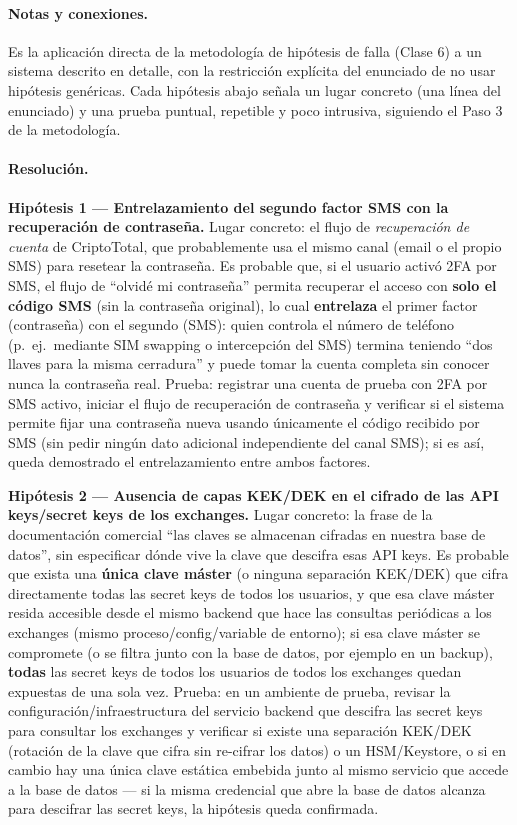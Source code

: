 \paragraph{Notas y conexiones.}
Es la aplicación directa de la metodología de hipótesis de falla (Clase 6) a un sistema
descrito en detalle, con la restricción explícita del enunciado de no usar hipótesis
genéricas. Cada hipótesis abajo señala un lugar concreto (una línea del enunciado) y una
prueba puntual, repetible y poco intrusiva, siguiendo el Paso 3 de la metodología.

\paragraph{Resolución.}

\textbf{Hipótesis 1 --- Entrelazamiento del segundo factor SMS con la recuperación de
contraseña.} Lugar concreto: el flujo de \emph{recuperación de cuenta} de CriptoTotal, que
probablemente usa el mismo canal (email o el propio SMS) para resetear la contraseña. Es
probable que, si el usuario activó 2FA por SMS, el flujo de ``olvidé mi contraseña'' permita
recuperar el acceso con \textbf{solo el código SMS} (sin la contraseña original), lo cual
\textbf{entrelaza} el primer factor (contraseña) con el segundo (SMS): quien controla el
número de teléfono (p.\ ej.\ mediante SIM swapping o intercepción del SMS) termina teniendo
``dos llaves para la misma cerradura'' y puede tomar la cuenta completa sin conocer nunca la
contraseña real. Prueba: registrar una cuenta de prueba con 2FA por SMS activo, iniciar el
flujo de recuperación de contraseña y verificar si el sistema permite fijar una contraseña
nueva usando únicamente el código recibido por SMS (sin pedir ningún dato adicional
independiente del canal SMS); si es así, queda demostrado el entrelazamiento entre ambos
factores.

\textbf{Hipótesis 2 --- Ausencia de capas KEK/DEK en el cifrado de las API keys/secret keys
de los exchanges.} Lugar concreto: la frase de la documentación comercial ``las claves se
almacenan cifradas en nuestra base de datos'', sin especificar dónde vive la clave que
descifra esas API keys. Es probable que exista una \textbf{única clave máster} (o ninguna
separación KEK/DEK) que cifra directamente todas las secret keys de todos los usuarios, y que
esa clave máster resida accesible desde el mismo backend que hace las consultas periódicas a
los exchanges (mismo proceso/config/variable de entorno); si esa clave máster se compromete
(o se filtra junto con la base de datos, por ejemplo en un backup), \textbf{todas} las secret
keys de todos los usuarios de todos los exchanges quedan expuestas de una sola vez. Prueba:
en un ambiente de prueba, revisar la configuración/infraestructura del servicio backend que
descifra las secret keys para consultar los exchanges y verificar si existe una separación
KEK/DEK (rotación de la clave que cifra sin re-cifrar los datos) o un HSM/Keystore, o si en
cambio hay una única clave estática embebida junto al mismo servicio que accede a la base de
datos --- si la misma credencial que abre la base de datos alcanza para descifrar las secret
keys, la hipótesis queda confirmada.

